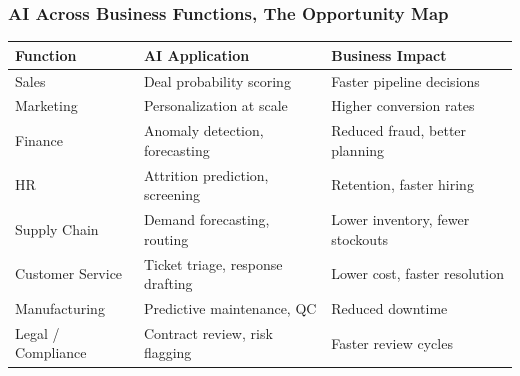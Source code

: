 \begin{frame}[fragile]\frametitle{AI Across Business Functions, The Opportunity Map}

\begin{center}
\begin{tabular}{|p{2cm}|p{2.5cm}|p{2.5cm}|}
\hline
\textbf{Function} & \textbf{AI Application} & \textbf{Business Impact} \\
\hline
Sales & Deal probability scoring & Faster pipeline decisions \\
Marketing & Personalization at scale & Higher conversion rates \\
Finance & Anomaly detection, forecasting & Reduced fraud, better planning \\
HR & Attrition prediction, screening & Retention, faster hiring \\
Supply Chain & Demand forecasting, routing & Lower inventory, fewer stockouts \\
Customer Service & Ticket triage, response drafting & Lower cost, faster resolution \\
Manufacturing & Predictive maintenance, QC & Reduced downtime \\
Legal / Compliance & Contract review, risk flagging & Faster review cycles \\
\hline
\end{tabular}
\end{center}

\end{frame}

